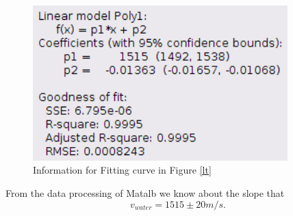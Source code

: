     \begin{figure}[H]
        \centering
        \includegraphics[height=6cm]{images/ltinfo.png}
        \caption{Information for Fitting curve in Figure \ref{lt}}\label{ltinfo}
    \end{figure}

    From the data processing of Matalb we know about the slope that 
    \[
        v_{water}=1515\pm20m/s.
    \]